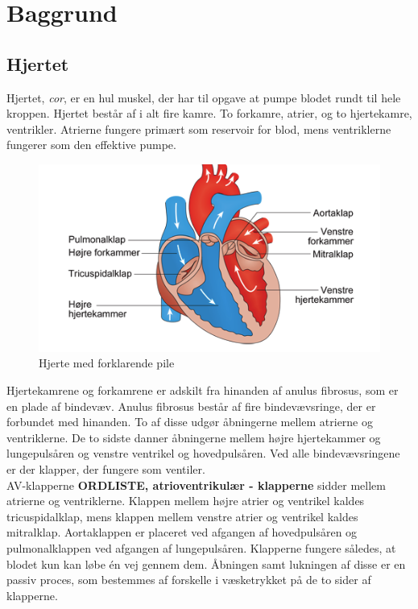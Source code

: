 \chapter{Baggrund}

\section{Hjertet}
Hjertet, \textit{cor}, er en hul muskel, der har til opgave at pumpe blodet rundt til hele kroppen. Hjertet består af i alt fire kamre. To forkamre, atrier, og to hjertekamre, ventrikler. Atrierne fungere primært som reservoir for blod, mens ventriklerne fungerer som den effektive pumpe.\\

\begin{figure}[htb]
	\centering
	\includegraphics[width=1\textwidth]{Figurer/Snip20150410_31}
	\caption{Hjerte med forklarende pile \protect\footnotemark} 
\end{figure}

Hjertekamrene og forkamrene er adskilt fra hinanden af anulus fibrosus, som er en plade af bindevæv. Anulus fibrosus består af fire bindevævsringe, der er forbundet med hinanden. To af disse udgør åbningerne mellem atrierne og ventriklerne. De to sidste danner åbningerne mellem højre hjertekammer og lungepulsåren og venstre ventrikel og hovedpulsåren. Ved alle bindevævsringene er der klapper, der fungere som ventiler.\\ 
AV-klapperne \textbf{ORDLISTE, atrioventrikulær - klapperne} sidder mellem atrierne og ventriklerne. Klappen mellem højre atrier og ventrikel kaldes tricuspidalklap, mens klappen mellem venstre atrier og ventrikel kaldes mitralklap. Aortaklappen er placeret ved afgangen af hovedpulsåren og pulmonalklappen ved afgangen af lungepulsåren. Klapperne fungere således, at blodet kun kan løbe én vej gennem dem. Åbningen samt lukningen af disse er en passiv proces, som bestemmes af forskelle i væsketrykket på de to sider af klapperne.\\ 

